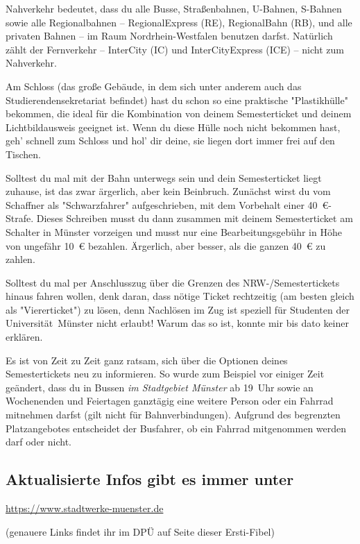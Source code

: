\begin{multicols}{2}
Nahverkehr bedeutet, dass du alle Busse, Straßenbahnen, U-Bahnen, S-Bahnen sowie alle Regionalbahnen -- RegionalExpress (RE), RegionalBahn (RB), und alle privaten Bahnen -- im Raum Nordrhein-Westfalen benutzen darfst. Natürlich zählt der Fernverkehr -- InterCity (IC) und InterCityExpress (ICE) -- nicht zum Nahverkehr.

Am Schloss (das große Gebäude, in dem sich unter anderem auch das Studierendensekretariat befindet) hast du schon so eine praktische "Plastikhülle" bekommen, die ideal für die Kombination von deinem Semesterticket und deinem Lichtbildausweis geeignet ist. Wenn du diese Hülle noch nicht bekommen hast, geh' schnell zum Schloss und hol' dir deine, sie liegen dort immer frei auf den Tischen.

Solltest du mal mit der Bahn unterwegs sein und dein Semesterticket liegt zuhause, ist das zwar ärgerlich, aber kein Beinbruch. Zunächst wirst du vom Schaffner als "Schwarzfahrer" aufgeschrieben, mit dem Vorbehalt einer \SI{40}{\euro}-Strafe. Dieses Schreiben musst du dann zusammen mit deinem Semesterticket am Schalter in Münster vorzeigen und musst nur eine Bearbeitungsgebühr in Höhe von ungefähr \SI{10}{\euro} bezahlen. Ärgerlich, aber besser, als die ganzen \SI{40}{\euro} zu zahlen.

Solltest du mal per Anschlusszug über die Grenzen des NRW-/Semestertickets hinaus fahren wollen, denk daran, dass nötige Ticket rechtzeitig (am besten gleich als "Viererticket") zu lösen, denn Nachlösen im Zug ist speziell für Studenten der Universität~Münster nicht erlaubt! Warum das so ist, konnte mir bis dato keiner erklären.
\columnbreak

Es ist von Zeit zu Zeit ganz ratsam, sich über die Optionen deines Semestertickets neu zu informieren. So wurde zum Beispiel vor einiger Zeit geändert, dass du in Bussen \emph{im Stadtgebiet Münster} ab 19~Uhr sowie an Wochenenden und Feiertagen ganztägig eine weitere Person oder ein Fahrrad mitnehmen darfst (gilt nicht für Bahnverbindungen). Aufgrund des begrenzten Platzangebotes entscheidet der Busfahrer, ob ein Fahrrad mitgenommen werden darf oder nicht.

\begin{center}
\subsection*{Aktualisierte Infos gibt es immer unter}

\url{https://www.stadtwerke-muenster.de}

(genauere Links findet ihr im DPÜ auf Seite \pageref{dpü} dieser Ersti-Fibel)
\end{center}

\end{multicols}
